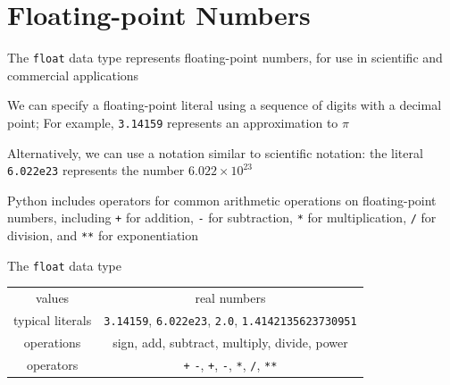 \documentclass[8pt,a4paper,compress]{beamer}
\begin{document}
\section{Floating-point Numbers}
\begin{frame}[fragile]
\pause

The \lstinline{float} data type represents floating-point numbers, for use in scientific and commercial applications

\pause
\bigskip

We can specify a floating-point literal using a sequence of digits with a decimal point; For example, \lstinline{3.14159} represents an approximation to $\pi$

\pause
\bigskip

Alternatively, we can use a notation similar to scientific notation: the literal \lstinline{6.022e23} represents the number $6.022 \times 10^{23}$

\pause
\bigskip

Python includes operators for common arithmetic operations on floating-point numbers, including \lstinline{+} for addition, \lstinline{-} for subtraction, \lstinline{*} for multiplication, \lstinline{/} for division, and \lstinline{**} for exponentiation

\pause
\bigskip

The \lstinline{float} data type
\begin{center}
\begin{tabular}{c|c}
values & real numbers \\
typical literals & \lstinline$3.14159$, \lstinline$6.022e23$, \lstinline$2.0$, \lstinline$1.4142135623730951$ \\ 
operations & sign, add, subtract, multiply, divide, power \\
operators & \lstinline$+$ \lstinline$-$, \lstinline$+$, \lstinline$-$, \lstinline$*$, \lstinline$/$, \lstinline$**$
\end{tabular} 
\end{center}
\end{frame}
\end{document}
